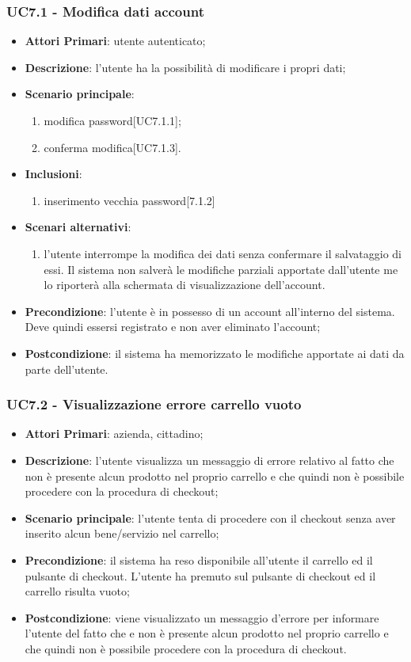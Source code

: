 \subsubsection{UC7.1 - Modifica dati account}
\begin{itemize}
	\item \textbf{Attori Primari}: utente autenticato;
	\item \textbf{Descrizione}: l'utente ha la possibilità di modificare i propri dati;
	\item \textbf{Scenario principale}:
	\begin{enumerate}
	\item modifica  password[UC7.1.1];
	\item conferma modifica[UC7.1.3].
	\end{enumerate}
	\item \textbf{Inclusioni}:
	\begin{enumerate}
	\item inserimento vecchia password[7.1.2]
	\end{enumerate}
	\item \textbf{Scenari alternativi}:
	\begin{enumerate}
	\item l'utente interrompe la modifica dei dati senza confermare il salvataggio di essi. Il sistema non salverà le modifiche parziali apportate dall'utente me lo riporterà alla schermata di visualizzazione dell'account.
	\end{enumerate}	 
	\item \textbf{Precondizione}: l'utente è in possesso di un account all'interno del sistema. Deve quindi essersi registrato e non aver eliminato l'account;
	\item \textbf{Postcondizione}: il sistema ha memorizzato le modifiche apportate ai dati da parte dell’utente.
\end{itemize}

\subsubsection{UC7.2 - Visualizzazione errore carrello vuoto}
\begin{itemize}
	\item \textbf{Attori Primari}: azienda, cittadino;
	\item \textbf{Descrizione}:
	l'utente visualizza un messaggio di errore relativo al fatto che non è presente alcun prodotto nel proprio carrello e che quindi non è possibile procedere con la procedura di checkout;
	\item \textbf{Scenario principale}: l'utente tenta di procedere con il checkout senza aver inserito alcun bene/servizio nel carrello;
	\item \textbf{Precondizione}: il sistema ha reso disponibile all'utente il carrello ed il pulsante di checkout. L'utente ha premuto sul pulsante di checkout ed il carrello risulta vuoto; 
	\item \textbf{Postcondizione}: viene visualizzato un messaggio d'errore per informare l'utente del fatto che e non è presente alcun prodotto nel proprio carrello e che quindi non è possibile procedere con la procedura di checkout.
\end{itemize}


